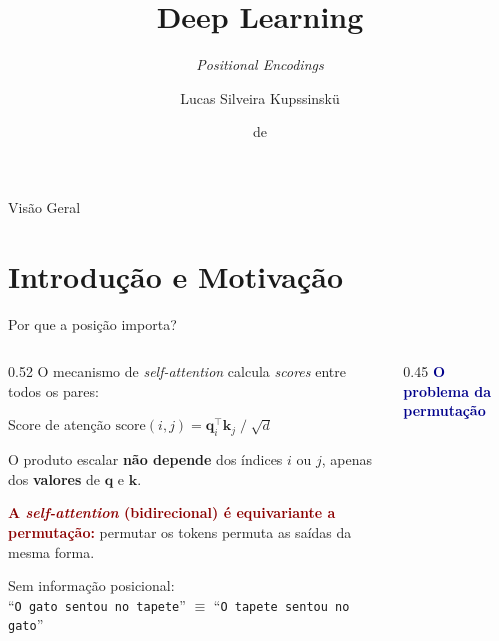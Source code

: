 \documentclass[aspectratio=169, xcolor=dvipsnames]{beamer}
\title{Deep Learning}
\subtitle{\textit{Positional Encodings}}
\author{Lucas Silveira Kupssinskü}
\institute
{ Machine Learning Theory and Applications Laboratory \\ PUCRS
}
\date{\mespor de \the\year}
\begin{document}
  \begin{frame}
    \titlepage
  \end{frame}

  \begin{frame}{Visão Geral}
    \tableofcontents
  \end{frame}

  \section{Introdução e Motivação}

  \begin{frame}{Por que a posição importa?}
    \begin{columns}
      \begin{column}{0.52\textwidth}
        O mecanismo de \textit{self-attention} calcula \textit{scores} entre todos os pares:
        \begin{block}{Score de atenção}
          $\text{score}(i,j) = \mathbf{q}_i^\top \mathbf{k}_j \;/\; \sqrt{d}$
        \end{block}
        O produto escalar \textbf{não depende} dos índices $i$ ou $j$, apenas dos \textbf{valores} de $\mathbf{q}$ e $\mathbf{k}$.

        \vspace{0.3em}
        \textcolor{DarkRed}{\textbf{A \textit{self-attention} (bidirecional) é equivariante a permutação:}} permutar os tokens permuta as saídas da mesma forma.

        \vspace{0.3em}
        Sem informação posicional:\\
        ``\texttt{O gato sentou no tapete}'' $\equiv$ ``\texttt{O tapete sentou no gato}''
      \end{column}
      \begin{column}{0.45\textwidth}
        \textcolor{DarkBlue}{\textbf{O problema da permutação}}
        \vspace{0.3em}

      \end{column}
    \end{columns}
  \end{frame}
\end{document}
